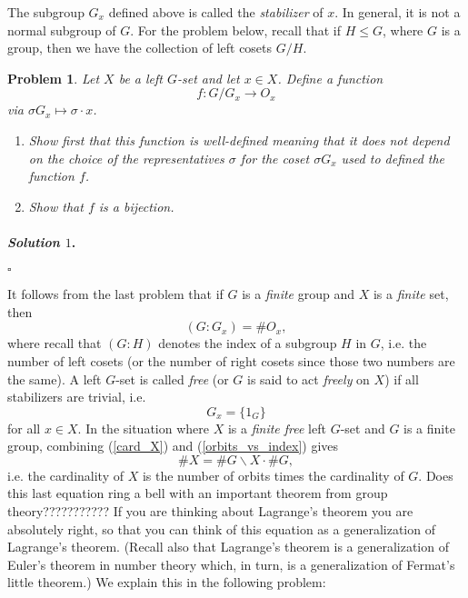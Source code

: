 \documentclass[reqno]{amsart}
\theoremstyle{plain}
\newtheorem{problem}{Problem}
\theoremstyle{definition}
\newenvironment{solution1}{\paragraph{\emph{Solution $1$}.}}{\hfill$\square$}
\begin{document}
The subgroup $G_{x}$ defined above is called the \emph{stabilizer} of $x$.  In general, it is not a normal subgroup of $G$.  For the problem below, recall that if $H \le G$, where $G$ is a group, then we have the collection of left cosets $G/H$.


\begin{problem}
Let $X$ be a left $G$-set and let $x \in X$.  Define a function 
$$f:G/G_{x} \rightarrow O_{x}$$ 
via $\sigma G_{x} \mapsto \sigma \cdot x$.  
\begin{enumerate}[label=(\alph*)]
\item Show first that this function is \emph{well-defined} meaning that it does not depend on the choice of the representatives $\sigma$ for the coset $\sigma G_{x}$ used to defined the function $f$.
\item Show that $f$ is a bijection.
\end{enumerate}
\end{problem}
\begin{solution1}

\end{solution1}

It follows from the last problem that if $G$ is a \emph{finite} group and $X$ is a \emph{finite} set, then
\begin{equation} \label{orbits_vs_index}
(G:G_{x}) = \# O_{x}, 
\end{equation}
where recall that $(G:H)$ denotes the index of a subgroup $H$ in $G$, i.e. the number of left cosets (or the number of right cosets since those two numbers are the same).  A left $G$-set is called \emph{free} (or $G$ is said to act \emph{freely} on $X$) if all stabilizers are trivial, i.e.
$$G_{x} = \{1_{G} \} $$
for all $x \in X$.  In the situation where $X$ is a \emph{finite free} left $G$-set and $G$ is a finite group, combining (\ref{card_X}) and (\ref{orbits_vs_index}) gives
\begin{equation} \label{class_eq}
\# X = \# G \backslash X \cdot \# G,
\end{equation}
i.e. the cardinality of $X$ is the number of orbits times the cardinality of $G$.  Does this last equation ring a bell with an important theorem from group theory???????????  If you are thinking about Lagrange's theorem you are absolutely right, so that you can think of this equation as a generalization of Lagrange's theorem.  (Recall also that Lagrange's theorem is a generalization of Euler's theorem in number theory which, in turn, is a generalization of Fermat's little theorem.)  We explain this in the following problem:
\end{document}

